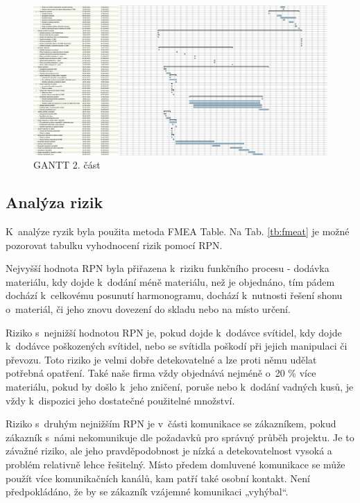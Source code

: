 \documentclass[a4paper, twoside, 11pt]{article}
\begin{document}
 		\begin{figure}[H]
 				\centering
 				\includegraphics[width=1\textwidth]{files/gantt_half2.png} 
				\caption{GANTT 2. část}
				\label{fig:gantt_half2}
 		\end{figure}			
		
	\subsection{Analýza rizik}
	K~analýze ryzik byla použita metoda FMEA Table. Na Tab. \ref{tb:fmeat} je možné pozorovat tabulku vyhodnocení rizik pomocí RPN. \par
	Nejvyšší hodnota RPN byla přiřazena k~riziku funkčního procesu - dodávka materiálu, kdy dojde k~dodání méně materiálu, než je objednáno, tím pádem dochází k~celkovému posunutí harmonogramu, dochází k~nutnosti řešení shonu o~materiál, či jeho znovu dovezení do skladu nebo na místo určení.\par
	Riziko s~nejnižší hodnotou RPN je, pokud dojde k~dodávce svítidel, kdy dojde k~dodávce poškozených svítidel, nebo se svítidla poškodí při jejich manipulaci či převozu. Toto riziko je velmi dobře detekovatelné a lze proti němu udělat potřebná opatření. Také naše firma vždy objednává nejméně o~20 \% více materiálu, pokud by došlo k~jeho zničení, poruše nebo k~dodání vadných kusů, je vždy k~dispozici jeho dostatečné použitelné množství.\par
	Riziko s~druhým nejnižším RPN je v~části komunikace se zákazníkem, pokud zákazník s~námi nekomunikuje dle požadavků pro správný průběh projektu. Je to závažné riziko, ale jeho pravděpodobnost je nízká a detekovatelnost vysoká a problém relativně lehce řešitelný. Místo předem domluvené komunikace se může použít více komunikačních kanálů, kam patří také osobní kontakt. Není předpokládáno, že by se zákazník vzájemné komunikaci „vyhýbal“.
	
\end{document}
